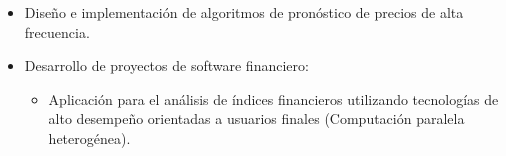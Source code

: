 \frame
{
\frametitle{}
 \begin{itemize}
	    \item Dise\~no e implementaci\'on de algoritmos de pron\'ostico de precios de alta frecuencia.
            \item Desarrollo de proyectos de software financiero:
	     \begin{itemize}
		  \item Aplicaci\'on para el an\'alisis de \'indices financieros utilizando tecnolog\'ias 
			de alto desempe\~no orientadas a usuarios finales (Computaci\'on paralela heterog\'enea).
	      \end{itemize}
	      
\end{itemize}	     
\begin{center}
\end{center}
}

